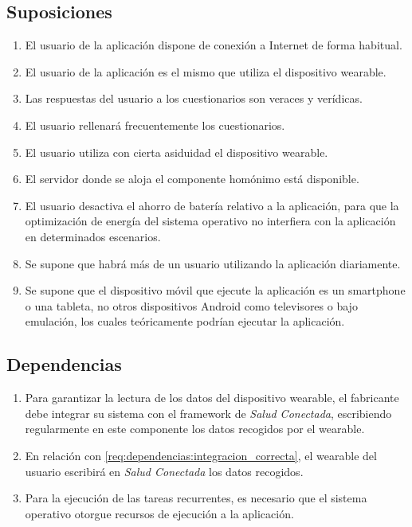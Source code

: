     \subsection{Suposiciones}
        \label{req:descripcion:suposiciones}

        \begin{enumerate}[label=\textbf{SUP-\arabic*}]
            \item El usuario de la aplicación dispone de conexión a Internet de forma habitual.
            \item El usuario de la aplicación es el mismo que utiliza el dispositivo \gls{wearable}.
            \item Las respuestas del usuario a los cuestionarios son veraces y verídicas.
            \item El usuario rellenará frecuentemente los cuestionarios.
            \item El usuario utiliza con cierta asiduidad el dispositivo \gls{wearable}.
            \item El servidor donde se aloja el componente homónimo está disponible.
            \item El usuario desactiva el ahorro de batería relativo a la aplicación, para que la optimización de energía del sistema operativo no interfiera con la aplicación en determinados escenarios.
            \item Se supone que habrá más de un usuario utilizando la aplicación diariamente.
            \item Se supone que el dispositivo móvil que ejecute la aplicación es un \gls{smartphone} o una tableta, no otros dispositivos Android como televisores o bajo emulación, los cuales teóricamente podrían ejecutar la aplicación.
        \end{enumerate}
        
    \subsection{Dependencias}
        \label{req:descripcion:dependencias}
    
        \begin{enumerate}[label=\textbf{DEP-\arabic*}]
            \item \label{req:dependencias:integracion_correcta} Para garantizar la lectura de los datos del dispositivo \gls{wearable}, el fabricante debe integrar su sistema con el \gls{framework} de \textit{Salud Conectada}, escribiendo regularmente en este componente los datos recogidos por el \gls{wearable}.
            \item En relación con \ref{req:dependencias:integracion_correcta}, el \gls{wearable} del usuario escribirá en \textit{Salud Conectada} los datos recogidos.
            \item \label{req:dependencias:planificacion} Para la ejecución de las tareas recurrentes, es necesario que el sistema operativo otorgue recursos de ejecución a la aplicación.
        \end{enumerate}

